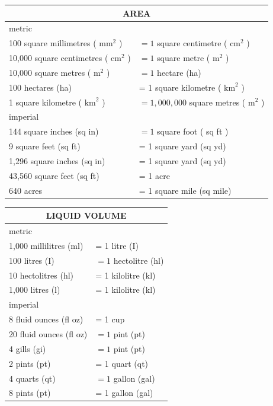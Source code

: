\documentclass[10pt]{article}
\begin{document}
\begin{center}
\begin{tabular}{|l|l|}
\hline
\multicolumn{2}{|c|}{AREA} \\
\hline
\multicolumn{2}{|l|}{metric} \\
\hline
100 square millimetres ( $\mathrm{mm}^{2}$ ) & $=1$ square centimetre ( $\mathrm{cm}^{2}$ ) \\
\hline
10,000 square centimetres ( $\mathrm{cm}^{2}$ ) & $=1$ square metre ( $\mathrm{m}^{2}$ ) \\
\hline
10,000 square metres ( $\mathrm{m}^{2}$ ) & $=1$ hectare (ha) \\
\hline
100 hectares (ha) & = 1 square kilometre ( $\mathrm{km}^{2}$ ) \\
\hline
1 square kilometre ( $\mathrm{km}^{2}$ ) & $=1,000,000$ square metres ( $\mathrm{m}^{2}$ ) \\
\hline
\multicolumn{2}{|l|}{imperial} \\
\hline
144 square inches (sq in) & $=1$ square foot ( sq ft ) \\
\hline
9 square feet (sq ft) & = 1 square yard (sq yd) \\
\hline
1,296 square inches (sq in) & = 1 square yard (sq yd) \\
\hline
43,560 square feet (sq ft) & = 1 acre \\
\hline
640 acres & = 1 square mile (sq mile) \\
\hline
\end{tabular}
\end{center}

\begin{center}
\begin{tabular}{|l|l|}
\hline
\multicolumn{2}{|c|}{LIQUID VOLUME} \\
\hline
\multicolumn{2}{|l|}{metric} \\
\hline
1,000 millilitres (ml) & = 1 litre (I) \\
\hline
100 litres (I) & $=1$ hectolitre (hl) \\
\hline
10 hectolitres (hl) & = 1 kilolitre (kl) \\
\hline
1,000 litres (l) & = 1 kilolitre (kl) \\
\hline
\multicolumn{2}{|l|}{imperial} \\
\hline
8 fluid ounces (fl oz) & = 1 cup \\
\hline
20 fluid ounces (fl oz) & $=1$ pint (pt) \\
\hline
4 gills (gi) & $=1$ pint (pt) \\
\hline
2 pints (pt) & = 1 quart (qt) \\
\hline
4 quarts (qt) & $=1$ gallon (gal) \\
\hline
8 pints (pt) & = 1 gallon (gal) \\
\hline
\end{tabular}
\end{center}
\end{document}
